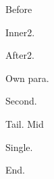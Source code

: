 \documentclass{article}
\begin{document}
Before
\begin{doublespace}
Inner2.
\end{doublespace}
After2.

\begin{onehalfspace}
Own para.

Second.
\end{onehalfspace}
Tail.
Mid
\begin{singlespace}
Single.
\end{singlespace}
End.
\end{document}
